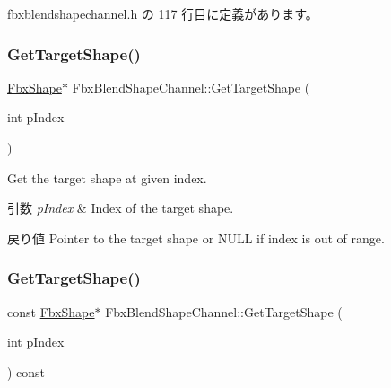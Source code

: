  fbxblendshapechannel.\+h の 117 行目に定義があります。

\mbox{\label{class_fbx_blend_shape_channel_a50cdc8d0c76e13c093453efca50484a6}} 
\subsubsection{\texorpdfstring{Get\+Target\+Shape()}{GetTargetShape()}\hspace{0.1cm}{\footnotesize\ttfamily [1/2]}}
{\footnotesize\ttfamily \hyperlink{class_fbx_shape}{Fbx\+Shape}$\ast$ Fbx\+Blend\+Shape\+Channel\+::\+Get\+Target\+Shape (\begin{DoxyParamCaption}\item[{int}]{p\+Index }\end{DoxyParamCaption})}

Get the target shape at given index. 
\begin{DoxyParams}{引数}
{\em p\+Index} & Index of the target shape. \\
\hline
\end{DoxyParams}
\begin{DoxyReturn}{戻り値}
Pointer to the target shape or {\ttfamily N\+U\+LL} if index is out of range. 
\end{DoxyReturn}
\mbox{\label{class_fbx_blend_shape_channel_ae91fea86db9ce91da637df78762b4fff}} 
\subsubsection{\texorpdfstring{Get\+Target\+Shape()}{GetTargetShape()}\hspace{0.1cm}{\footnotesize\ttfamily [2/2]}}
{\footnotesize\ttfamily const \hyperlink{class_fbx_shape}{Fbx\+Shape}$\ast$ Fbx\+Blend\+Shape\+Channel\+::\+Get\+Target\+Shape (\begin{DoxyParamCaption}\item[{int}]{p\+Index }\end{DoxyParamCaption}) const}

